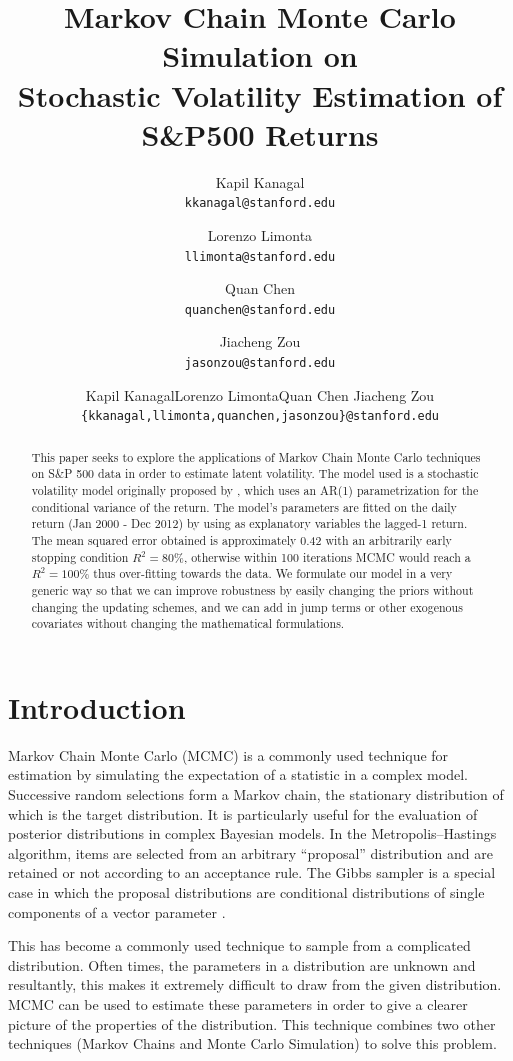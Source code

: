 \documentclass[letterpaper]{article}
\title{Markov Chain Monte Carlo Simulation on\\Stochastic Volatility Estimation of S\&P500 Returns}
\author{
	Kapil Kanagal\\ \texttt{kkanagal@stanford.edu}
	\and
	Lorenzo Limonta\\ \texttt{llimonta@stanford.edu}
    \and	
	Quan Chen\\ \texttt{quanchen@stanford.edu}
	\and
	Jiacheng Zou\\ \texttt{jasonzou@stanford.edu}
}
\author{
	Kapil Kanagal\qquad Lorenzo Limonta\qquad Quan Chen \qquad Jiacheng Zou
    \\\texttt{\{kkanagal,llimonta,quanchen,jasonzou\}@stanford.edu}
}
\begin{document}
\maketitle
\tableofcontents
\newpage
\begin{abstract}
This paper seeks to explore the applications of Markov Chain Monte Carlo techniques on  S\&P 500  data in order to estimate latent volatility. The model used is a stochastic volatility model originally proposed by \citet{rossi1994bayesian}, which uses an AR(1) parametrization for the conditional variance of the return. The model's parameters are fitted on the daily return (Jan 2000 - Dec 2012) by using as explanatory variables the lagged-1 return. The mean squared error obtained is approximately 0.42 with an arbitrarily early stopping condition $R^2=80\%$, otherwise within 100 iterations MCMC would reach a $R^2=100\%$ thus over-fitting towards the data. We formulate our model in a very generic way so that we can improve robustness by easily changing the priors without changing the updating schemes, and we can add in jump terms or other exogenous covariates without changing the mathematical formulations.
\end{abstract}
\section{Introduction}
Markov Chain Monte Carlo (MCMC) is a commonly used technique for estimation by simulating the expectation of a statistic in a complex model. Successive random selections form a Markov chain, the stationary distribution of which is the target distribution. It is particularly useful for the evaluation of posterior distributions in complex Bayesian models. In the Metropolis–Hastings algorithm, items are selected from an arbitrary “proposal” distribution and are retained or not according to an acceptance rule. The Gibbs sampler is a special case in which the proposal distributions are conditional distributions of single components of a vector parameter \cite{gilks2005markov}.

This has become a commonly used technique to sample from a complicated distribution. Often times, the parameters in a distribution are unknown and resultantly, this makes it extremely difficult to draw from the given distribution. MCMC can be used to estimate these parameters in order to give a clearer picture of the properties of the distribution. This technique combines two other techniques (Markov Chains and Monte Carlo Simulation) to solve this problem.
\end{document}
